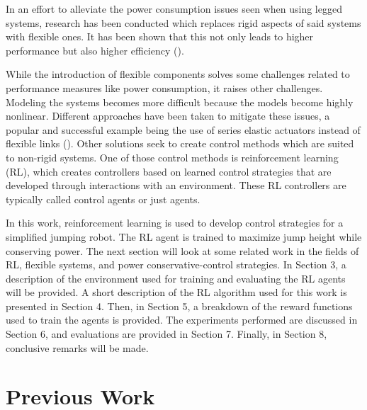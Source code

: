 \documentclass{ifacconf}
\begin{document}
   In an effort to alleviate the power consumption issues seen when using legged systems, research has been conducted which replaces rigid aspects of said systems with flexible ones. It has been shown that this not only leads to higher performance but also higher efficiency (\cite{Sugiyama2004, Galloway2011, Hurst2008, Seok2015}).

   While the introduction of flexible components solves some challenges related to performance measures like power consumption, it raises other challenges. Modeling the systems becomes more difficult because the models become highly nonlinear. Different approaches have been taken to mitigate these issues, a popular and successful example being the use of series elastic actuators instead of flexible links (\cite{Pratt1995, Iida2005, Ahmadi1997}). Other solutions seek to create control methods which are suited to non-rigid systems. One of those control methods is reinforcement learning (RL), which creates controllers based on learned control strategies that are developed through interactions with an environment. These RL controllers are typically called control agents or just agents.
   
   In this work, reinforcement learning is used to develop control strategies for a simplified jumping robot. The RL agent is trained to maximize jump height while conserving power. The next section will look at some related work in the fields of RL, flexible systems, and power conservative-control strategies. In Section 3, a description of the environment used for training and evaluating the RL agents will be provided. A short description of the RL algorithm used for this work is presented in Section 4. Then, in Section 5, a breakdown of the reward functions used to train the agents is provided. The experiments performed are discussed in Section 6, and evaluations are provided in Section 7. Finally, in Section 8, conclusive remarks will be made. 


\section{Previous Work}
\end{document}
